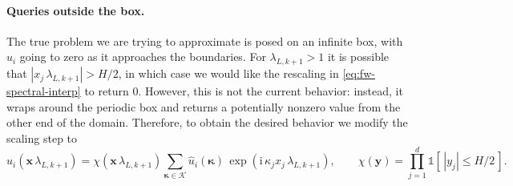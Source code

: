 \documentclass{article}
\begin{document}
\paragraph{Queries outside the box.}
The true problem we are trying to approximate is posed on an infinite box, with $u_i$ going to zero as it approaches the boundaries.
For $\lambda_{L,k+1} > 1$ it is possible that $|x_j\,\lambda_{L,k+1}| > H/2$, in which case we would like the rescaling in \eqref{eq:fw-spectral-interp} to return $0$.
However, this is not the current behavior: instead, it wraps around the periodic box and returns a potentially nonzero value from the other end of the domain.
Therefore, to obtain the desired behavior we modify the scaling step to
\begin{equation}\label{eq:fw-dilate-cutoff}
  u_i\!\left(\mathbf{x}\, \lambda_{L,k+1}\right)
  = \chi\!\left(\mathbf{x}\, \lambda_{L,k+1}\right)
    \sum_{\boldsymbol{\kappa} \in \mathcal{K}} \hat{u}_i(\boldsymbol{\kappa})\,
    \exp\!\left( \mathrm{i}\, \kappa_j x_j\, \lambda_{L,k+1} \right),
  \qquad
  \chi(\mathbf{y}) = \prod_{j=1}^{d} \mathbb{1}\!\left[\, |y_j| \le H/2 \,\right].
\end{equation}
\end{document}
